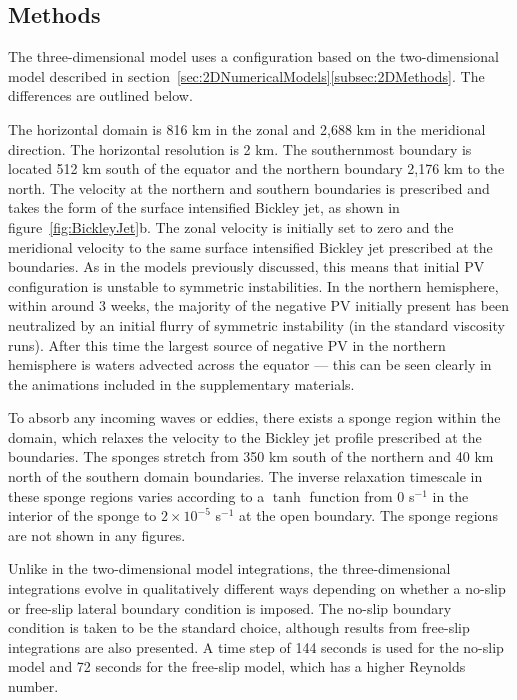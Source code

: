     \subsection{Methods}
    The three-dimensional model uses a configuration based on the two-dimensional model described in section~\ref{sec:2DNumericalModels}\ref{subsec:2DMethods}. The differences are outlined below.

    The horizontal domain is 816 km in the zonal and 2,688 km in the meridional direction. The horizontal resolution is 2 km. The southernmost boundary is located 512 km south of the equator and the northern boundary 2,176 km to the north. The velocity at the northern and southern boundaries is prescribed and takes the form of the surface intensified Bickley jet, as shown in figure~\ref{fig:BickleyJet}b. The zonal velocity is initially set to zero and the meridional velocity to the same  surface intensified Bickley jet prescribed at the boundaries. As in the models previously discussed, this means that initial PV configuration is unstable to symmetric instabilities. In the northern hemisphere, within around 3 weeks, the majority of the negative PV initially present has been neutralized by an initial flurry of symmetric instability (in the standard viscosity runs). After this time the largest source of negative PV in the northern hemisphere is waters advected across the equator --- this can be seen clearly in the animations included in the supplementary materials.
    
    To absorb any incoming waves or eddies, there exists a sponge region within the  domain, which relaxes the velocity to the Bickley jet profile prescribed at the boundaries. The sponges stretch from 350 km south of the northern and 40 km north of the southern domain boundaries. The inverse relaxation timescale in these sponge regions varies according to a $\tanh$ function from 0 s$^{-1}$ in the interior of the sponge to $2 \times 10^{-5}$ s$^{-1}$ at the open boundary. The sponge regions are not shown in any figures.

    Unlike in the two-dimensional model integrations, the three-dimensional integrations evolve in qualitatively different ways depending on whether a no-slip or free-slip lateral boundary condition is imposed. The no-slip boundary condition is taken to be the standard choice, although results from free-slip integrations are also presented. A time step of 144 seconds is used for the no-slip model and 72 seconds for the free-slip model, which has a higher Reynolds number.

